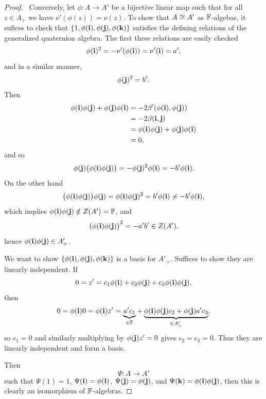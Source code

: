 \begin{proof}
\backwardproof\ Conversely, let $\phi\colon A\to A'$ be a bijective
linear map such that for all $z\in A_{+}$ we have $\nu'(\phi(z))=\nu(z)$.
To show that $A\cong A'$ as $\mathbb{F}$-algebas, it sufices to check that
$\{1,\phi(\mathbf{i}),\phi(\mathbf{j}),\phi(\mathbf{k})\}$ satisfies the
defining relations of the generalized quaternion algebra.
The first three relations are easily checked
\begin{equation}
\phi(\mathbf{i})^{2}=-\nu'(\phi(\mathbf{i}))=\nu'(\mathbf{i})=a',
\end{equation}
and in a similar manner,
\begin{equation}
\phi(\mathbf{j})^{2}=b'.
\end{equation}
Then
\begin{subequations}
  \begin{align}
\phi(\mathbf{i})\phi(\mathbf{j})+\phi(\mathbf{j})\phi(\mathbf{i})
&=-2\beta'(\phi(\mathbf{i}),\phi(\mathbf{j}))\\
&=-2\beta(\mathbf{i},\mathbf{j})\\
&=\phi(\mathbf{i})\phi(\mathbf{j})+\phi(\mathbf{j})\phi(\mathbf{i})\\
&=0,
  \end{align}
\end{subequations}
and so
\begin{equation}
\phi(\mathbf{j})\bigl(\phi(\mathbf{i})\phi(\mathbf{j})\bigr)=-\phi(\mathbf{j})^{2}\phi(\mathbf{i})=-b'\phi(\mathbf{i}).
\end{equation}
On the other hand
\begin{equation}
\bigl(\phi(\mathbf{i})\phi(\mathbf{j})\bigr)\phi(\mathbf{j})=\phi(\mathbf{i})\phi(\mathbf{j})^{2}=b'\phi(\mathbf{i})\neq-b'\phi(\mathbf{i}),
\end{equation}
which implies $\phi(\mathbf{i})\phi(\mathbf{j})\notin Z(A')=\mathbb{F}$, and
\begin{equation}
\bigl(\phi(\mathbf{i})\phi(\mathbf{j})\bigr)^{2}=-a'b'\in Z(A'),
\end{equation}
hence $\phi(\mathbf{i})\phi(\mathbf{j})\in A'_{+}$.

We want to show
$\{\phi(\mathbf{i}),\phi(\mathbf{j}),\phi(\mathbf{k})\}$ is a basis for
$A'_{+}$. Suffices to show they are linearly independent. If
\begin{equation}
0=z'=c_{1}\phi(\mathbf{i})+c_{2}\phi(\mathbf{j})+c_{3}\phi(\mathbf{i})\phi(\mathbf{j}),
\end{equation}
then
\begin{equation}
0=\phi(\mathbf{i})0=\phi(\mathbf{i})z'=\underbrace{a'c_{1}}_{\in\mathbb{F}}+\underbrace{\phi(\mathbf{i})\phi(\mathbf{j})c_{2}+\phi(\mathbf{j})a'c_{3}}_{\in A'_{+}},
\end{equation}
so $c_{1}=0$ and similarly multiplying by $\phi(\mathbf{j})z'=0$ gives
$c_{2}=c_{3}=0$. Thus they are linearly independent and form a basis.

Then
\begin{equation}
\Psi\colon A\to A'
\end{equation}
such that $\Psi(1)=1$, $\Psi(\mathbf{i})=\phi(\mathbf{i})$,
$\Psi(\mathbf{j})=\phi(\mathbf{j})$, and
$\Psi(\mathbf{k})=\phi(\mathbf{i})\phi(\mathbf{j})$, then this is clearly an
isomorphism of $\mathbb{F}$-algebras.
\end{proof}

